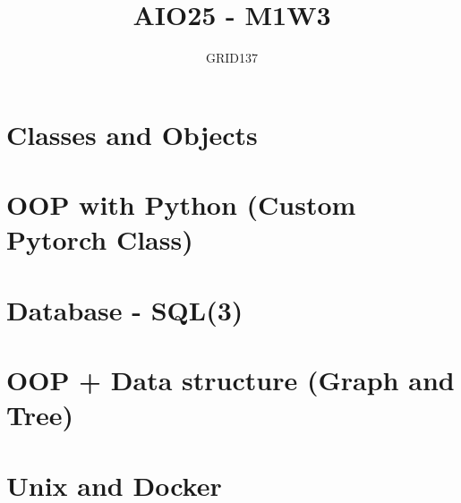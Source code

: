 \documentclass[12pt]{report}
\title{AIO25 - M1W3}
\author{GRID137}
\begin{document}
	
	\maketitle
	\tableofcontents
	\listoffigures
	\listoftables
	
	\chapter{Classes and Objects}
	
	\chapter{OOP with Python (Custom Pytorch Class)}
	
	\chapter{Database - SQL(3)}
	
	\chapter{OOP + Data structure (Graph and Tree)}
	
	\chapter{Unix and Docker}
	
\end{document}
